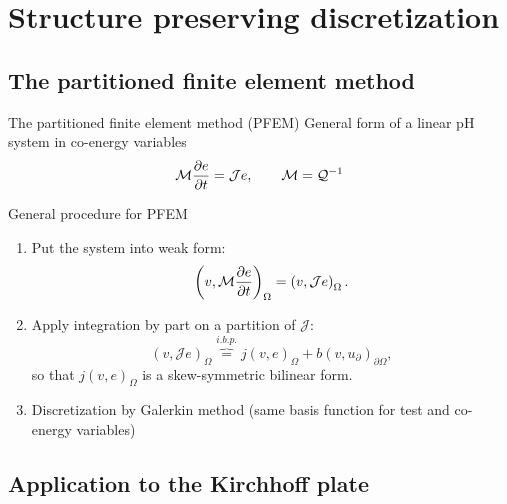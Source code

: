 \documentclass[aspectratio=169]{ISAE-Beamer}
\begin{document}
\section{Structure preserving discretization}

\subsection{The partitioned finite element method}



\begin{frame}{The partitioned finite element method (PFEM)}
General form of a linear pH system in co-energy variables
\begin{equation*}
\mathcal{M} \diffp{e}{t} = \mathcal{J} e, \qquad \mathcal{M} = \mathcal{Q}^{-1}
\end{equation*}

\begin{block}{General procedure for PFEM}
	\setlength{\abovedisplayskip}{1pt}
	\setlength{\belowdisplayskip}{1pt}
	\begin{enumerate}
		\item Put the system into weak form:
		\begin{equation*}
		\left(v, \mathcal{M} \diffp{e}{t} \right)_{\Omega} = \left(v, \mathcal{J} e \right)_{\Omega}.
		\end{equation*}
		\item Apply integration by part on a partition of $\mathcal{J}$:
		\begin{equation*}
		\left(v, \mathcal{J} e \right)_{\Omega} \overbrace{=}^{i.b.p.} j(v, e)_{\Omega} + b(v, u_\partial)_{\partial \Omega},
		\end{equation*}
		so that $j(v, e)_{\Omega}$ is a skew-symmetric bilinear form.
		\item Discretization by Galerkin method (same basis function for test and co-energy variables)
	\end{enumerate}
\end{block}
\end{frame}

\subsection{Application to the Kirchhoff plate}
\end{document}
